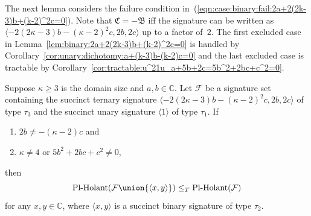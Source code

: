\documentclass[11pt]{article}
\newcommand{\PlHolant}{\operatorname{Pl-Holant}}
\begin{document}
The next lemma considers the failure condition in~(\ref{eqn:case:binary:fail:2a+2(2k-3)b+(k-2)^2c=0}).
Note that $\mathfrak{C} = -\mathfrak{B}$ iff the signature can be written as $\langle -2 (2 \kappa - 3) b - (\kappa - 2)^2 c, 2 b, 2 c \rangle$ up to a factor of~$2$.
The first excluded case in Lemma~\ref{lem:binary:2a+2(2k-3)b+(k-2)^2c=0} is handled by Corollary~\ref{cor:unary:dichotomy:a+(k-3)b-(k-2)c=0}
and the last excluded case is tractable by Corollary~\ref{cor:tractable:u^21u_a+5b+2c=5b^2+2bc+c^2=0}.

\begin{lemma} \label{lem:binary:2a+2(2k-3)b+(k-2)^2c=0}
 Suppose $\kappa \ge 3$ is the domain size and $a, b \in \mathbb{C}$.
 Let $\mathcal{F}$ be a signature set containing the succinct ternary signature $\langle -2 (2 \kappa - 3) b - (\kappa - 2)^2 c, 2 b, 2 c \rangle$ of type $\tau_3$
 and the succinct unary signature $\langle 1 \rangle$ of type $\tau_1$.
 If
 \begin{enumerate}
  \item $2 b \ne -(\kappa - 2) c$ and \label{cond:lem:binary:2a+2(2k-3)b+(k-2)^2c=0:2b!=-(k-2)c}
  \item $\kappa \ne 4$ or $5 b^2 + 2 b c + c^2 \ne 0$, \label{cond:lem:binary:2a+2(2k-3)b+(k-2)^2c=0:k!=4_5b^2+2bc+c^2!=0}
 \end{enumerate}
 then
 \[
  \PlHolant(\mathcal{F} \union \{\langle x,y \rangle\}) \le_T \PlHolant(\mathcal{F})
 \]
 for any $x,y \in \mathbb{C}$,
 where $\langle x,y \rangle$ is a succinct binary signature of type $\tau_2$.
\end{lemma}
\end{document}
